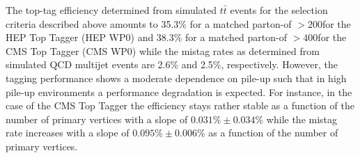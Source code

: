 The top-tag efficiency determined from simulated $t\bar{t}$ events for the selection criteria described above amounts to 35.3\% for a matched parton-\pt of $> 200$\gev for the HEP Top Tagger (HEP WP0) and 38.3\% for a matched parton-\pt of $> 400$\gev for the CMS Top Tagger (CMS WP0) while the mistag rates as determined from simulated QCD multijet events are 2.6\% and 2.5\%, respectively. However, the tagging performance shows a moderate dependence on pile-up such that in high pile-up environments a performance degradation is expected. For instance, in the case of the CMS Top Tagger the efficiency stays rather stable as a function of the number of primary vertices with a slope of $0.031\% \pm 0.034\%$ while the mistag rate increases with a slope of $0.095\% \pm 0.006\%$ as a function of the number of primary vertices.      


